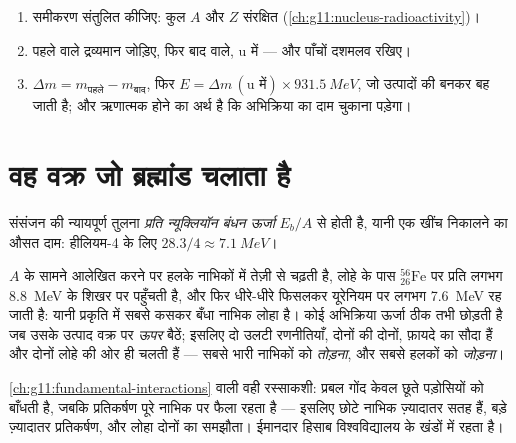 \begin{method}[नाभिकीय अभिक्रिया का ऊर्जा-लेखा]\label{met:g12:nuclear-energy:balance}
\begin{enumerate}
  \item समीकरण संतुलित कीजिए: कुल $A$ और $Z$ संरक्षित (\cref{ch:g11:nucleus-radioactivity})।
  \item पहले वाले द्रव्यमान जोड़िए, फिर बाद वाले, \unit{u} में --- और पाँचों
        दशमलव रखिए।
  \item $\Delta m = m_{\text{पहले}} - m_{\text{बाद}}$, फिर $E = \Delta m\,(\text{u में}) \times \qty{931.5}{MeV}$, जो उत्पादों की  बनकर बह जाती
        है; और ऋणात्मक होने का अर्थ है कि अभिक्रिया का दाम चुकाना पड़ेगा।
\end{enumerate}
\end{method}

\section{वह वक्र जो ब्रह्मांड चलाता है}

\begin{definition}[प्रति न्यूक्लियॉन बंधन ऊर्जा]\label{def:g12:nuclear-energy:pernucleon}
संसंजन की न्यायपूर्ण तुलना \emph{प्रति न्यूक्लियॉन बंधन ऊर्जा} $E_b/A$ से होती है, यानी एक  खींच
निकालने का औसत दाम: हीलियम-4 के लिए $28.3/4 \approx \qty{7.1}{MeV}$।
\end{definition}

\begin{proposition}[लोहे का शिखर, और नीचे उतरती दो सड़कें]\label{prop:g12:nuclear-energy:ironpeak}
$A$ के सामने आलेखित करने पर  हलके
नाभिकों में तेज़ी से चढ़ती है, लोहे के पास ${}^{56}_{26}\mathrm{Fe}$ पर प्रति 
लगभग \qty{8.8}{MeV} के शिखर पर पहुँचती है, और फिर धीरे-धीरे फिसलकर यूरेनियम पर लगभग
\qty{7.6}{MeV} रह जाती है: यानी प्रकृति में सबसे कसकर बँधा नाभिक लोहा है। कोई
अभिक्रिया ऊर्जा ठीक तभी छोड़ती है जब उसके उत्पाद वक्र पर \emph{ऊपर}
बैठें; इसलिए दो उलटी रणनीतियाँ, दोनों की दोनों, फ़ायदे का सौदा हैं और दोनों लोहे
की ओर ही चलती हैं --- सबसे भारी नाभिकों को \emph{तोड़ना}, और सबसे हलकों को
\emph{जोड़ना}।
\end{proposition}
\admitted

\begin{remark}[शिखर क्यों]\label{rem:g12:nuclear-energy:whypeak}
\cref{ch:g11:fundamental-interactions} वाली वही रस्साकशी: प्रबल गोंद केवल छूते पड़ोसियों को बाँधती है, जबकि
 प्रतिकर्षण पूरे नाभिक पर फैला रहता है --- इसलिए छोटे नाभिक
ज़्यादातर सतह हैं, बड़े ज़्यादातर प्रतिकर्षण, और लोहा दोनों का समझौता। ईमानदार
हिसाब विश्वविद्यालय के खंडों में रहता है।
\end{remark}


